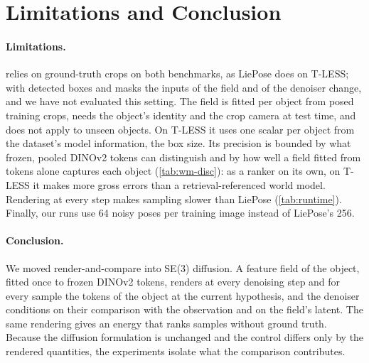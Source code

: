 \section{Limitations and Conclusion}
\label{sec:conclusion}

\paragraph{Limitations.}
\method relies on ground-truth crops on both benchmarks, as LiePose does on T-LESS; with detected boxes and masks the inputs of the
field and of the denoiser change, and we have not evaluated this setting. The field is fitted per object from posed training crops,
needs the object's identity and the crop camera at test time, and does not apply to unseen objects. On T-LESS it uses one scalar per
object from the dataset's model information, the box size. Its precision is bounded by what frozen, pooled DINOv2 tokens can
distinguish and by how well a field fitted from tokens alone captures each object (\cref{tab:wm-disc}): as a ranker on its own, on T-LESS it
makes more gross errors than a retrieval-referenced world model. Rendering at every step makes sampling slower than LiePose (\cref{tab:runtime}). Finally,
our runs use 64 noisy poses per training image instead of LiePose's 256. 

\paragraph{Conclusion.}
We moved render-and-compare into SE(3) diffusion. A feature field of the object, fitted once to frozen DINOv2 tokens, renders at every
denoising step and for every sample the tokens of the object at the current hypothesis, and the denoiser conditions on their comparison
with the observation and on the field's latent. The same rendering gives an energy that ranks samples without ground truth. Because the
diffusion formulation is unchanged and the control differs only by the rendered quantities, the experiments isolate what the comparison
contributes. 
